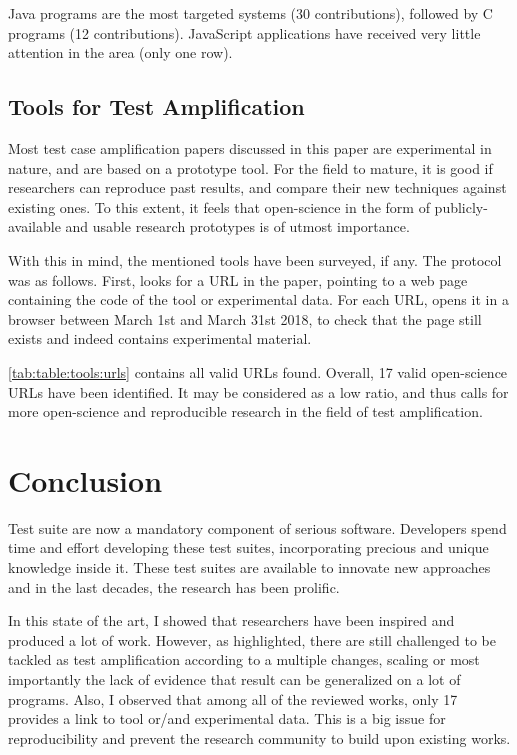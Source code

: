 Java programs are the most targeted systems (30 contributions), followed by C programs (12 contributions). 
JavaScript applications have received very little attention in the area (only one row).

\subsection{Tools for Test Amplification}
\label{subsec:sota:analysis:tools}

Most test case amplification papers discussed in this paper are experimental in nature, and are based on a prototype tool. 
For the field to mature, it is good if researchers can reproduce past results, and compare their new techniques against existing ones.
To this extent, it feels that open-science in the form of publicly-available and usable research prototypes is of utmost importance. 

With this in mind, the mentioned tools have been surveyed, if any. 
The protocol was as follows. 
First, looks for a URL in the paper, pointing to a web page containing the code of the tool or experimental data.  
For each URL, opens it in a browser between March 1st and March 31st 2018, to check that the page still exists and indeed contains experimental material.



\autoref{tab:table:tools:urls} contains all valid URLs found. 
Overall, 17 valid open-science URLs have been identified. 
It may be considered as a low ratio, and thus calls for more open-science and reproducible research in the field of test amplification.

\section{Conclusion}
\label{sec:sota:conclusion}

Test suite are now a mandatory component of serious software.
Developers spend time and effort developing these test suites, incorporating precious and unique knowledge inside it.
These test suites are available to innovate new approaches and in the last decades, the research has been prolific.

In this state of the art, I showed that researchers have been inspired and produced a lot of work.
However, as highlighted, there are still challenged to be tackled as test amplification according to a multiple changes, scaling or most importantly the lack of evidence that result can be generalized on a lot of programs.
Also, I observed that among all of the reviewed works, only 17 provides a link to tool or/and experimental data.
This is a big issue for reproducibility and prevent the research community to build upon existing works.

